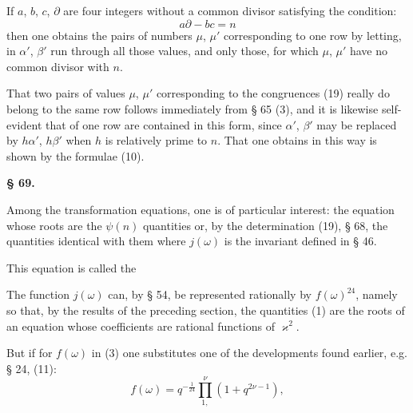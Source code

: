If $a$, $b$, $c$, $\partial$ are four integers without a common divisor
satisfying the condition:
\[
a\partial - bc = n
\]
then one obtains the pairs of numbers $\mu$, $\mu'$ corresponding to one
row by letting, in
$\alpha'$, $\beta'$ run through all those values, and only those, for which
$\mu$, $\mu'$ have no common divisor with $n$.

That two pairs of values $\mu$, $\mu'$ corresponding to the congruences (19)
really do belong to the same row follows immediately
from § 65 (3), and it is likewise self-evident that 
of one row are contained in this form, since $\alpha'$, $\beta'$
may be replaced by $h\alpha'$, $h\beta'$ when $h$ is relatively prime to $n$. That
one obtains  in this way is shown by
the formulae (10).

\begin{center}
\textbf{§ 69.} \textbf{}
\end{center}

Among the transformation equations, one is of particular
interest: the equation whose roots are the $\psi(n)$ quantities
or, by the determination (19), § 68, the quantities identical with
them
where $j(\omega)$ is the invariant defined in § 46.

This equation is called the 

The function $j(\omega)$ can, by § 54, be represented rationally by $f(\omega)^{24}$,
namely
so that, by the results of the preceding section, the
quantities (1) are the roots of an equation whose coefficients
are rational functions of $\varkappa^2$.

But if for $f(\omega)$ in (3) one substitutes one of the developments
found earlier, e.g. § 24, (11):
\[
f(\omega) = q^{-\frac{1}{24}} \prod_{1,}^{\nu} (1+q^{2\nu-1}),
\]
